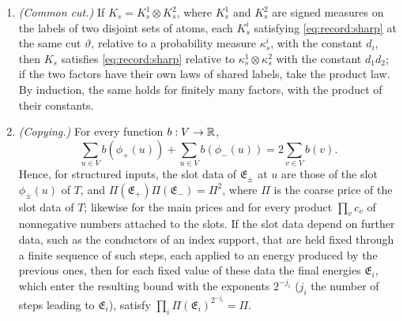 \begin{lemma}
\begin{enumerate}[label=(\alph*)]
 satisfies \eqref{eq:record:sharp} with the same $d$ relative to
 $\kappa'_s\otimes\pi'_s$.
\item[(d$'$)] \emph{(Common cut.)} If $K_s=K^1_s\otimes K^2_s$, where $K^1_s$
 and $K^2_s$ are signed measures on the labels of two disjoint sets of atoms,
 each $K^i_s$ satisfying \eqref{eq:record:sharp} at the same cut $\vartheta$,
 relative to a probability measure $\kappa^i_s$, with the constant $d_i$,
 then $K_s$ satisfies \eqref{eq:record:sharp} relative to
 $\kappa^1_s\otimes\kappa^2_s$ with the constant $d_1d_2$; if the two factors
 have their own laws of shared labels, take the product law. By induction,
 the same holds for finitely many factors, with the product of their
 constants.
\item \emph{(Copying.)} For every function $b:V\to\mathbb R$,
 \[
  \sum_{u\in V}b(\phi_+(u))+\sum_{u\in V}b(\phi_-(u))=2\sum_{v\in V}b(v).
 \]
 Hence, for structured inputs, the slot data of $\mathfrak E_\pm$ at $u$ are
 those of the slot $\phi_\pm(u)$ of $T$, and
 $\Pi(\mathfrak E_+)\Pi(\mathfrak E_-)=\Pi^2$, where $\Pi$ is the coarse price
 of the slot data of $T$; likewise for the main prices and for every product
 $\prod_vc_v$ of nonnegative numbers attached to the slots. If the slot data
 depend on further data, such as the conductors of an index support, that
 are held fixed through a finite sequence of such steps, each applied to an
 energy produced by the previous ones, then for each fixed value of these
 data the final energies $\mathfrak E_i$, which enter the resulting bound
 with the exponents $2^{-j_i}$ ($j_i$ the number of steps leading to
 $\mathfrak E_i$), satisfy $\prod_i\Pi(\mathfrak E_i)^{2^{-j_i}}=\Pi$.
\end{enumerate}
\end{lemma}

